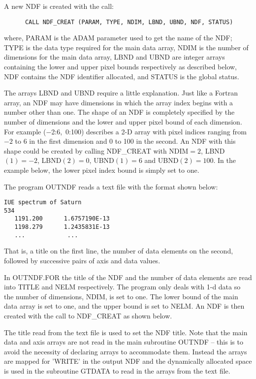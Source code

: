 A new NDF is created with the call:
\begin{verbatim}
      CALL NDF_CREAT (PARAM, TYPE, NDIM, LBND, UBND, NDF, STATUS)
\end{verbatim}
where, PARAM is the ADAM parameter used to get the name of the NDF;
TYPE is the data type required for the  main data array,
NDIM is the number of dimensions for the main data array,
LBND and UBND are integer arrays containing  the lower and upper pixel bounds 
respectively as described below,
NDF contains  the NDF identifier allocated, and STATUS is the global status.

The arrays LBND and UBND require a little explanation. 
Just like a Fortran array, an NDF may have dimensions in which the 
array index begins with a number other than one.
The shape of an NDF is completely specified by the number of dimensions
and the lower and upper pixel bound of each dimension.
For example ($-$2:6,~0:100) describes a 2-D array with pixel indices
ranging from $-2$ to 6 in the first dimension and 0 to 100 in the second.
An NDF with this shape could be created by calling NDF\_CREAT with
NDIM$=2$, LBND$(1)=-2$, LBND$(2)=0$, UBND$(1)=6$ and UBND$(2)=100$. 
In the example below, the lower pixel index bound is simply set  to 
one.

The program OUTNDF reads a text file with 
the format  shown below:
\begin{verbatim}
IUE spectrum of Saturn
534
   1191.200      1.6757190E-13   
   1198.279      1.2435831E-13   
   ...            ...
\end{verbatim}
That is, a title on the first line, the number of data elements on the 
second, followed by successive pairs of axis and data values.

In OUTNDF.FOR the title of the NDF and the number of data elements 
are read into TITLE and NELM respectively.
The program only deals with 1-d data so the
number of dimensions, NDIM, is set to one.
The lower bound of the main data array  is set to one, 
and the upper bound is set to NELM.
An NDF is then created with the call to NDF\_CREAT as shown below.

The title read from the text file is used to set the NDF title.
Note that the main data and axis arrays are not read in the main subroutine 
OUTNDF --  this is to avoid the necessity of declaring arrays to accommodate 
them.
Instead the arrays are mapped for 'WRITE'  in the output NDF 
and the dynamically allocated space is used in 
the subroutine GTDATA to read in the arrays from 
the text file.

